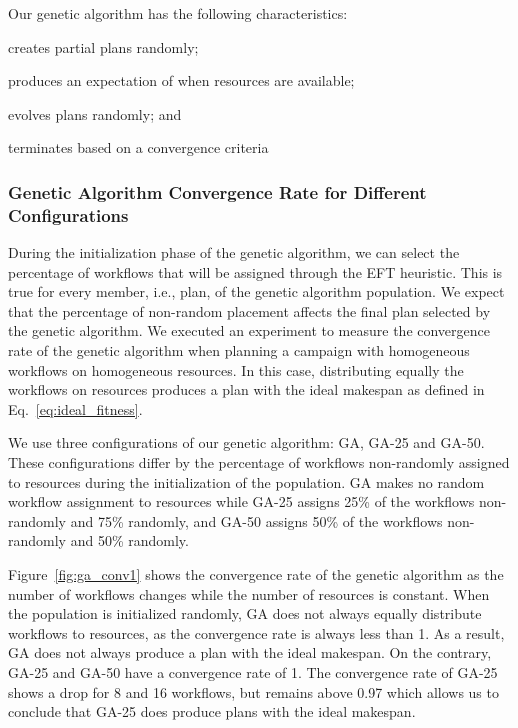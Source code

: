 Our genetic algorithm has the following characteristics:
\begin{inparaenum}[(1)]
    \item creates partial plans randomly;
    \item produces an expectation of when resources are available;
    \item evolves plans randomly; and
    \item terminates based on a convergence criteria
\end{inparaenum}

\subsubsection*{Genetic Algorithm Convergence Rate for Different Configurations}

During the initialization phase of the genetic algorithm, we can select the
percentage of workflows that will be assigned through the EFT heuristic. This is
true for every member, i.e., plan, of the genetic algorithm population. We
expect that the percentage of non-random placement affects the final plan
selected by the genetic algorithm. We executed an experiment to measure the
convergence rate of the genetic algorithm when planning a campaign with
homogeneous workflows on homogeneous resources. In this case, distributing
equally the workflows on resources produces a plan with the ideal makespan as
defined in Eq.~\ref{eq:ideal_fitness}.

We use three configurations of our genetic algorithm: GA, GA-25 and GA-50. These
configurations differ by the percentage of workflows non-randomly assigned to
resources during the initialization of the population. GA makes no random
workflow assignment to resources while GA-25 assigns 25\% of the workflows
non-randomly and 75\% randomly, and GA-50 assigns 50\% of the
workflows non-randomly and 50\% randomly.


Figure~\ref{fig:ga_conv1} shows the convergence rate of the genetic algorithm as
the number of workflows changes while the number of resources is constant. When
the population is initialized randomly, GA does not always equally distribute
workflows to resources, as the convergence rate is always less than 1. As a
result, GA does not always produce a plan with the ideal makespan. On the
contrary, GA-25 and GA-50 have a convergence rate of 1. The convergence rate of
GA-25 shows a drop for 8 and 16 workflows, but remains above 0.97 which allows
us to conclude that GA-25 does produce plans with the ideal makespan.

